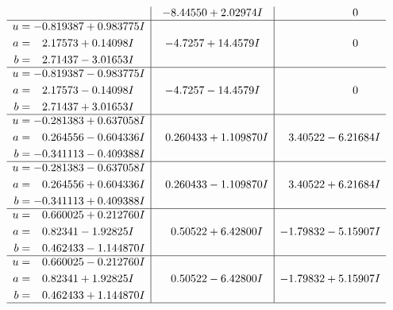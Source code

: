 \documentclass[1p]{elsarticle_modified}
\theoremstyle{definition}
\begin{document}
$$\begin{array}{c|c|c}
 & -8.44550 + 2.02974 I & \phantom{-0.000000 } 0 \\ \hline\begin{aligned}
u &= -0.819387 + 0.983775 I \\
a &= \phantom{-}2.17573 + 0.14098 I \\
b &= \phantom{-}2.71437 - 3.01653 I\end{aligned}
 & -4.7257 + 14.4579 I & \phantom{-0.000000 } 0 \\ \hline\begin{aligned}
u &= -0.819387 - 0.983775 I \\
a &= \phantom{-}2.17573 - 0.14098 I \\
b &= \phantom{-}2.71437 + 3.01653 I\end{aligned}
 & -4.7257 - 14.4579 I & \phantom{-0.000000 } 0 \\ \hline\begin{aligned}
u &= -0.281383 + 0.637058 I \\
a &= \phantom{-}0.264556 - 0.604336 I \\
b &= -0.341113 - 0.409388 I\end{aligned}
 & \phantom{-}0.260433 + 1.109870 I & \phantom{-}3.40522 - 6.21684 I \\ \hline\begin{aligned}
u &= -0.281383 - 0.637058 I \\
a &= \phantom{-}0.264556 + 0.604336 I \\
b &= -0.341113 + 0.409388 I\end{aligned}
 & \phantom{-}0.260433 - 1.109870 I & \phantom{-}3.40522 + 6.21684 I \\ \hline\begin{aligned}
u &= \phantom{-}0.660025 + 0.212760 I \\
a &= \phantom{-}0.82341 - 1.92825 I \\
b &= \phantom{-}0.462433 - 1.144870 I\end{aligned}
 & \phantom{-}0.50522 + 6.42800 I & -1.79832 - 5.15907 I \\ \hline\begin{aligned}
u &= \phantom{-}0.660025 - 0.212760 I \\
a &= \phantom{-}0.82341 + 1.92825 I \\
b &= \phantom{-}0.462433 + 1.144870 I\end{aligned}
 & \phantom{-}0.50522 - 6.42800 I & -1.79832 + 5.15907 I\\
 \hline 
 \end{array}$$\newpage$$\begin{array}{c|c|c}  

\end{array}$$
\end{document}
